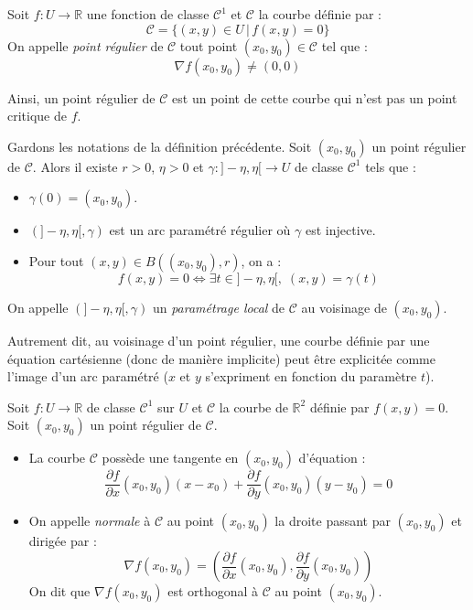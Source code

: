 \documentclass[french,11pt,twoside]{VcCours}
\begin{document}
\begin{Definition}{} Soit $f : U \rightarrow \mathbb{R}$ une fonction de classe $\mathcal{C}^1$ et $\mathcal{C}$ la courbe définie par :
$$ \mathcal{C} = \lbrace (x,y) \in U \, \vert \, f(x,y)=0 \rbrace$$
On appelle \emph{point régulier} de $\mathcal{C}$ tout point $(x_0,y_0) \in \mathcal{C}$ tel que :
$$ \nabla f(x_0,y_0) \neq (0,0)$$
\end{Definition}

Ainsi, un point régulier de $\mathcal{C}$ est un point de cette courbe qui n'est pas un point critique de $f$.

\begin{Theoreme}{} Gardons les notations de la définition précédente. Soit $(x_0,y_0)$ un point régulier de $\mathcal{C}$. Alors il existe $r>0$, $\eta>0$ et $\gamma : ]- \eta, \eta[ \rightarrow U$ de classe $\mathcal{C}^1$ tels que :
\begin{itemize}
\item $\gamma(0)= (x_0,y_0)$.
\item $(]-\eta,\eta[, \gamma)$ est un arc paramétré régulier où $\gamma$ est injective.
\item Pour tout $(x,y) \in B((x_0,y_0),r)$, on a :
$$ f(x,y)=0 \Longleftrightarrow \exists t \in ]- \eta, \eta[, \; (x,y)=\gamma(t)$$
\end{itemize}
On appelle $(]-\eta,\eta[, \gamma)$ un \emph{paramétrage local} de $\mathcal{C}$ au voisinage de $(x_0,y_0)$.
\end{Theoreme}

\medskip

Autrement dit, au voisinage d'un point régulier, une courbe définie par une équation cartésienne (donc de manière implicite) peut être explicitée comme l'image d'un arc paramétré ($x$ et $y$ s'expriment en fonction du paramètre $t$).

\medskip

\begin{TheoremeDefinition}{} Soit $f : U \rightarrow \mathbb{R}$ de classe $\mathcal{C}^1$ sur $U$ et $\mathcal{C}$ la courbe de $\mathbb{R}^2$ définie par $f(x,y)=0$. Soit $(x_0,y_0)$ un point régulier de $\mathcal{C}$.
\begin{itemize}
\item La courbe $\mathcal{C}$ possède une tangente en $(x_0,y_0)$ d'équation :
$$ \dfrac{\partial f}{\partial  x}(x_0,y_0)(x-x_0) + \dfrac{\partial f}{\partial y}(x_0,y_0) (y-y_0)=0$$
\item On appelle \emph{normale} à $\mathcal{C}$ au point $(x_0,y_0)$ la droite passant par $(x_0,y_0)$ et dirigée par :
$$ \nabla f(x_0,y_0) = \left(\dfrac{\partial f}{\partial  x}(x_0,y_0), \dfrac{\partial f}{\partial  y}(x_0,y_0) \right)$$
On dit que $ \nabla f(x_0,y_0)$ est orthogonal à $\mathcal{C}$ au point $(x_0,y_0)$.
\end{itemize}
\end{TheoremeDefinition}{}
\end{document}
